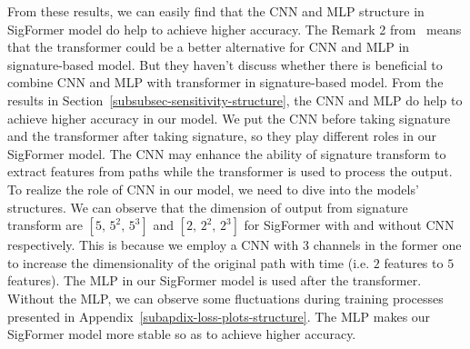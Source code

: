 \documentclass[]{article}
\renewcommand{\(}{\left(}
\renewcommand{\)}{\right)}
\begin{document}
	From these results, we can easily find that the CNN and MLP structure in SigFormer model do help to achieve higher accuracy. The Remark 2 from~\cite{tong_2023} means that the transformer could be a better alternative for CNN and MLP in signature-based model. But they haven't discuss whether there is beneficial to combine CNN and MLP with transformer in signature-based model. From the results in Section~\ref{subsubsec-sensitivity-structure}, the CNN and MLP do help to achieve higher accuracy in our model. We put the CNN before taking signature and the transformer after taking signature, so they play different roles in our SigFormer model. The CNN may enhance the ability of signature transform to extract features from paths while the transformer is used to process the output. To realize the role of CNN in our model, we need to dive into the models' structures. We can observe that the dimension of output from signature transform are $[5,\,5^2,\,5^3]$ and $[2,\,2^2,\,2^3]$ for SigFormer with and without CNN respectively. This is because we employ a CNN with $3$ channels in the former one to increase the dimensionality of the original path with time (i.e. $2$ features to $5$ features). The MLP in our SigFormer model is used after the transformer. Without the MLP, we can observe some fluctuations during training processes presented in Appendix~\ref{subapdix-loss-plots-structure}. The MLP makes our SigFormer model more stable so as to achieve higher accuracy.
	
\end{document}
